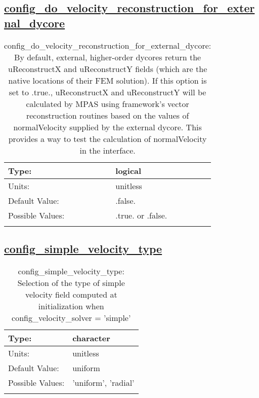 \subsection[config\_do\_velocity\_reconstruction\_for\_external\_dycore]{\hyperref[sec:nm_tab_velocity_solver]{config\_do\_velocity\_reconstruction\_for\_external\_dycore}}
\label{subsec:nm_sec_config_do_velocity_reconstruction_for_external_dycore}
\begin{center}
\begin{longtable}{| p{2.0in} || p{4.0in} |}
    \hline
    Type: & logical \\
    \hline
    Units: & \si{unitless} \\
    \hline
    Default Value: & .false. \\
    \hline
    Possible Values: & .true. or .false. \\
    \hline
    \caption{config\_do\_velocity\_reconstruction\_for\_external\_dycore: By default, external, higher-order dycores return the uReconstructX and uReconstructY fields (which are the native locations of their FEM solution).  If this option is set to .true., uReconstructX and uReconstructY will be calculated by MPAS using framework's vector reconstruction routines based on the values of normalVelocity supplied by the external dycore.  This provides a way to test the calculation of normalVelocity in the interface.}
\end{longtable}
\end{center}
\subsection[config\_simple\_velocity\_type]{\hyperref[sec:nm_tab_velocity_solver]{config\_simple\_velocity\_type}}
\label{subsec:nm_sec_config_simple_velocity_type}
\begin{center}
\begin{longtable}{| p{2.0in} || p{4.0in} |}
    \hline
    Type: & character \\
    \hline
    Units: & \si{unitless} \\
    \hline
    Default Value: & uniform \\
    \hline
    Possible Values: & 'uniform', 'radial' \\
    \hline
    \caption{config\_simple\_velocity\_type: Selection of the type of simple velocity field computed at initialization when config\_velocity\_solver = 'simple'}
\end{longtable}
\end{center}
